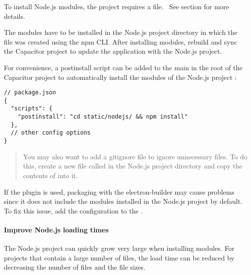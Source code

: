 To install Node.js modules, the project requires a  file.~\cite{npm}
See section  for more details.

The modules have to be installed in the Node.js project directory in which the  file was created using the npm CLI.
After installing modules, rebuild and sync the Capacitor project to update the application with the Node.js project.

For convenience, a postinstall script can be added to the main  in the root of the Capacitor project to automatically install the modules of the Node.js project \cite{npm}:

\begin{verbatim}
// package.json
{
  "scripts": {
    "postinstall": "cd static/nodejs/ && npm install"
  },
  // other config options
}
\end{verbatim}

\begin{quote}
  You may also want to add a gitignore file to ignore unnecessary files.
  To do this, create a new file called  in the Node.js project directory and copy the contents of  into it.
\end{quote}

\begin{important}[Important]
  If the  plugin is used, packaging with the electron-builder may cause problems since it does not include the modules installed in the Node.js project by default. \cite{electron-builder}
  \\[1em]
  To fix this issue, add the configuration  to the .
  \cite{electron-builder}
\end{important}

\newpage

\paragraph{Improve Node.js loading times}
\label{sec:Capacitor-NodeJS:ImproveLoadingTimes}

The Node.js project can quickly grow very large when installing modules.
For projects that contain a large number of files, the load time can be reduced by decreasing the number of files and the file sizes.
\cite{nodejs-mobile:docs}

